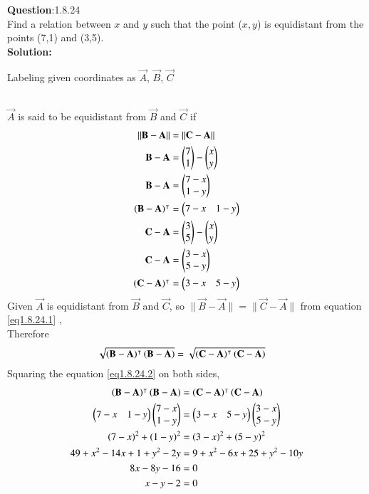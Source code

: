 \documentclass[journal]{IEEEtran}
\begin{document}
\textbf{Question}:1.8.24\\
Find a relation between $x$ and $y$ such that the point ($x,y$) is equidistant from the points (7,1) and (3,5).
\\
\textbf{Solution:}
\renewcommand{\tablename}{Table 1.8.24.1}
\begin{table}[h!]
  \centering
  
  \caption{Labeling given coordinates as $\vec{A}$, $\vec{B}$, $\vec{C}$}
\end{table}
\\
$\vec{A}$ is said to be equidistant from $\vec{B}$ and $\vec{C}$ if 
 \begin{align}
	 \lVert \mathbf{B} - \mathbf{A} \rVert & = \lVert \mathbf{C} - \mathbf{A} \rVert \label{eq1.8.24.1} \\
	 \mathbf{B} - \mathbf{A} & = \begin{pmatrix}7 \\ 1\end{pmatrix} - \begin{pmatrix}x \\ y\end{pmatrix} \\ 
	 \mathbf{B} - \mathbf{A} & = \begin{pmatrix}7 - x \\ 1 - y\end{pmatrix} \\ 
	 \left(\mathbf{B} - \mathbf{A}\right)^\intercal & = \begin{pmatrix}7 - x & 1 - y\end{pmatrix} \\ 
	 \mathbf{C} - \mathbf{A} & = \begin{pmatrix}3 \\ 5\end{pmatrix} - \begin{pmatrix}x \\ y\end{pmatrix} \\ 
	 \mathbf{C} - \mathbf{A} & = \begin{pmatrix}3 - x \\ 5 - y\end{pmatrix} \\ 
	 \left(\mathbf{C} - \mathbf{A}\right)^\intercal & = \begin{pmatrix}3 - x & 5 - y\end{pmatrix}
 \end{align}
Given $\vec{A}$ is equidistant from $\vec{B}$ and $\vec{C}$, so $\lVert \vec{B} - \vec{A} \rVert = \lVert \vec{C} - \vec{A} \rVert$ from equation \ref{eq1.8.24.1} , \\
Therefore
\begin{align}
	\sqrt{\left(\mathbf{B} - \mathbf{A}\right)^\intercal\left(\mathbf{B} - \mathbf{A}\right)} & = \sqrt{\left(\mathbf{C} - \mathbf{A}\right)^\intercal\left(\mathbf{C} - \mathbf{A}\right)} \label{eq1.8.24.2}
\end{align}
Squaring the equation \ref{eq1.8.24.2} on both sides,
\begin{align}
	\left(\mathbf{B} - \mathbf{A}\right)^\intercal\left(\mathbf{B} - \mathbf{A}\right) & = \left(\mathbf{C} - \mathbf{A}\right)^\intercal\left(\mathbf{C} - \mathbf{A}\right) \\
	\begin{pmatrix}7 - x & 1 - y\end{pmatrix}\begin{pmatrix}7 - x \\ 1 - y\end{pmatrix} & = \begin{pmatrix}3 - x & 5 - y\end{pmatrix}\begin{pmatrix}3 - x \\ 5 - y\end{pmatrix} \\
	\left(7 - x\right)^2 + \left(1 - y\right)^2 & = \left(3 - x\right)^2 + \left(5 - y\right)^2 \\
	49 + x^2 - 14x + 1 + y^2 - 2y & = 9 + x^2 -6x + 25 + y^2 -10y \\
	8x - 8y - 16 & = 0 \\
	x - y - 2 & = 0
\end{align}
\end{document}
